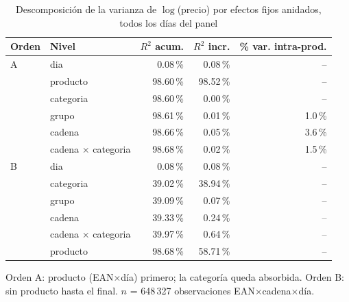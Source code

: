 \begin{table}[htbp]
\caption{Descomposici\'on de la varianza de $\log$(precio) por efectos fijos anidados, todos los d\'ias del panel}
\label{tab:varianza}
\centering\scriptsize\setlength{\tabcolsep}{3pt}
\begin{tabular}{@{}llrrr@{}}
\toprule
Orden & Nivel & $R^2$ acum. & $R^2$ incr. & \% var. intra-prod. \\
\midrule
A & dia & 0.08\,\% & 0.08\,\% & -- \\
 & producto & 98.60\,\% & 98.52\,\% & -- \\
 & categoria & 98.60\,\% & 0.00\,\% & -- \\
 & grupo & 98.61\,\% & 0.01\,\% & 1.0\,\% \\
 & cadena & 98.66\,\% & 0.05\,\% & 3.6\,\% \\
 & cadena $\times$ categoria & 98.68\,\% & 0.02\,\% & 1.5\,\% \\
\midrule
B & dia & 0.08\,\% & 0.08\,\% & -- \\
 & categoria & 39.02\,\% & 38.94\,\% & -- \\
 & grupo & 39.09\,\% & 0.07\,\% & -- \\
 & cadena & 39.33\,\% & 0.24\,\% & -- \\
 & cadena $\times$ categoria & 39.97\,\% & 0.64\,\% & -- \\
 & producto & 98.68\,\% & 58.71\,\% & -- \\
\bottomrule\end{tabular}
\par\smallskip\raggedright\scriptsize Orden A: producto (EAN$\times$d\'ia) primero; la categor\'ia queda absorbida. Orden B: sin producto hasta el final. $n$ = 648\,327 observaciones EAN$\times$cadena$\times$d\'ia.
\end{table}
